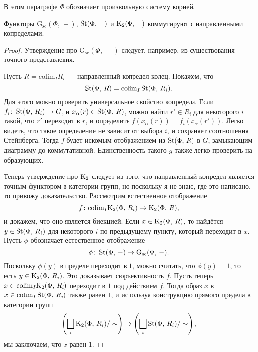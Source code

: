\documentclass[oneside, 11pt]{amsart} \pdfoutput=1
\begin{document}
В этом параграфе $\Phi$ обозначает произвольную систему корней.

\begin{lemma}
\label{k2cdc}
Функторы  $\mathrm G_{\mathrm{sc}}(\Phi,\,-)$, $\mathop{\mathrm{St}}\nolimits(\Phi,\,-)$ и ${\mathrm{K}}_2(\Phi,\,-)$ коммутируют с направленными копределами. 
\end{lemma}
\begin{proof}
Утверждение про $\mathrm G_{\mathrm{sc}}(\Phi,\,-)$ следует, например, из существования точного представления. 

Пусть $R=\mathrm{colim}_I R_i$~--- направленный копредел колец. Покажем, что 
$$
\mathop{\mathrm{St}}\nolimits(\Phi,\,R)=\mathrm{colim}_I\mathop{\mathrm{St}}\nolimits(\Phi,\,R_i).
$$
Для этого можно проверить универсальное свойство копредела. Если $f_i\colon\mathop{\mathrm{St}}\nolimits(\Phi,\,R_i)\rightarrow G$, и $x_\alpha(r)\in\mathop{\mathrm{St}}\nolimits(\Phi,\,R)$, можно найти $r'\in R_i$ для некоторого $i$ такой, что $r'$ переходит в $r$, и определить $f(x_\alpha(r))=f_i(x_\alpha(r'))$. Легко видеть, что такое определение не зависит от выбора $i$, и сохраняет соотношения Стейнберга. Тогда $f$ будет искомым отображением из $\mathop{\mathrm{St}}\nolimits(\Phi,\,R)$ в $G$, замыкающим диаграмму до коммутативной. Единственность такого $g$ также легко проверить на образующих.

Теперь утверждение про ${\mathrm{K}}_2$ следует из того, что направленный копредел является точным функтором в категории групп, но поскольку я не знаю, где это написано, то привожу доказательство. Рассмотрим естественное отображение
$$
f\colon\mathrm{colim}_I{\mathrm{K}}_2(\Phi,\,R_i)\rightarrow{\mathrm{K}}_2(\Phi,\,R),
$$
и докажем, что оно является биекцией. Если $x\in{\mathrm{K}}_2(\Phi,\,R)$, то найдётся $y\in\mathop{\mathrm{St}}\nolimits(\Phi,\,R_i)$ для некоторого $i$ по предыдущему пункту, который переходит в $x$. Пусть $\phi$ обозначает естественное отображение
$$
\phi\colon\mathop{\mathrm{St}}\nolimits(\Phi,\,-)\rightarrow\mathrm G_{\mathrm{sc}}(\Phi,\,-).
$$
Поскольку $\phi(y)$ в пределе переходит в $1$, можно считать, что $\phi(y)=1$, то есть $y\in{\mathrm{K}}_2(\Phi,\,R_i)$. Это доказывает сюръективность $f$. Пусть теперь $x\in\mathrm{colim}_I{\mathrm{K}}_2(\Phi,\,R_i)$ переходит в $1$ под действием $f$. Тогда образ $x$ в $x\in\mathrm{colim}_I\mathop{\mathrm{St}}\nolimits(\Phi,\,R_i)$ также равен $1$, и используя конструкцию прямого предела в категории групп
$$
\left(\bigsqcup_i{\mathrm{K}}_2(\Phi,\,R_i)/\sim\right)\rightarrow\left(\bigsqcup_i\mathop{\mathrm{St}}\nolimits(\Phi,\,R_i)/\sim\right),
$$
мы заключаем, что $x$ равен $1$.
\end{proof}
\end{document}
